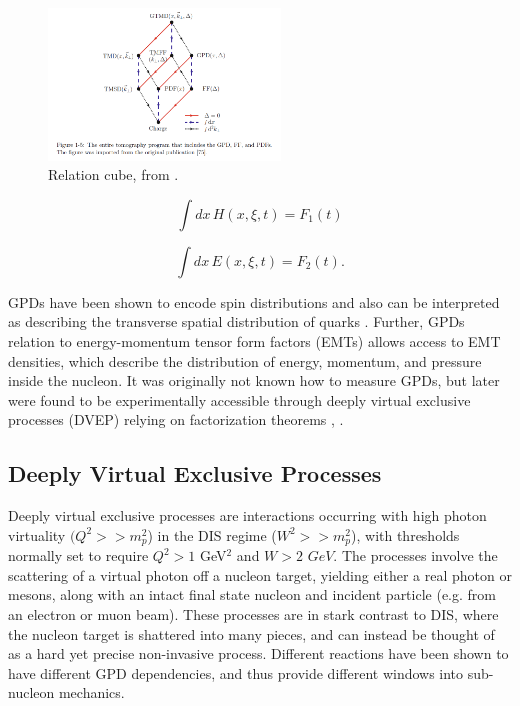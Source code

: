             \begin{figure}[H]
                \centering
                \includegraphics[width=0.55\textwidth,trim={3cm 1.5cm 3cm 0},clip]{Chapters/Ch1-Intro/Ch1-Sec2-GPDs-DVMP/pics/gtmd-cube-sangbaek.png}
                \caption[Distribution Relationship Cube]{Relation cube, from \parencite{Burkardt2016ModellingStructure}. }
                \label{fig:gmtd_cube}
            \end{figure}
        
        \begin{equation}\label{gpd_f1}
        \int dx \, H(x, \xi, t) = F_1(t)
        \end{equation}
        
        \begin{equation}\label{gpd_f2}
        \int dx \, E(x, \xi, t) = F_2(t). 
        \end{equation}


        GPDs have been shown \parencite{Ji1997Gauge-InvariantSpin} to encode spin distributions and also can be interpreted as describing the transverse spatial distribution of quarks \parencite{Burkardt2007GPDs0}. Further, GPDs relation to energy-momentum tensor form factors (EMTs) allows access to EMT densities, which describe the distribution of energy, momentum, and pressure inside the nucleon. It was originally not known how to measure GPDs, but later were found to be experimentally accessible through deeply virtual exclusive processes (DVEP) relying on factorization theorems \parencite{Collins1999ProofQCD}, \parencite{Bauer2002HardTheory}. 
           
    
    
    \subsection{Deeply Virtual Exclusive Processes}

        Deeply virtual exclusive processes are interactions occurring with high photon virtuality $(Q^2 >> m_p^2$) in the DIS regime ($W^2>>m_p^2$), with thresholds normally set to require  $Q^2 > 1$ GeV$^2$ and $W>2$ $GeV$. The processes involve the scattering of a virtual photon off a nucleon target, yielding either a real photon or mesons, along with an intact final state nucleon and incident particle (e.g. from an electron or muon beam). These processes are in stark contrast to DIS, where the nucleon target is shattered into many pieces, and can instead be thought of as a hard yet precise non-invasive process. Different reactions have been shown to have different GPD dependencies, and thus provide different windows into sub-nucleon mechanics. 

